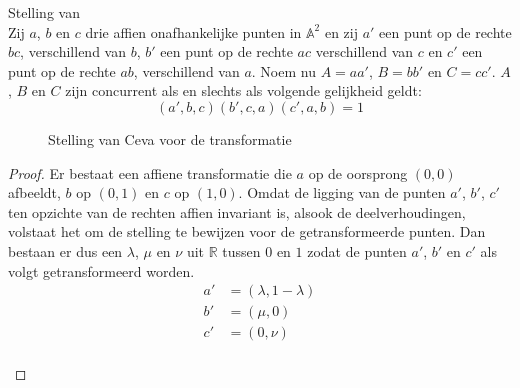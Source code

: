\documentclass[main.tex]{subfiles}
\begin{document}

\begin{st}
  Stelling van \\
  Zij $a$, $b$ en $c$ drie affien onafhankelijke punten in $\mathbb{A}^{2}$ en zij $a'$ een punt op de rechte $bc$, verschillend van $b$, $b'$ een punt op de rechte $ac$ verschillend van $c$ en $c'$ een punt op de rechte $ab$, verschillend van $a$.
  Noem nu $A = aa'$, $B = bb'$ en $C=cc'$.
  $A$, $B$ en $C$ zijn concurrent als en slechts als volgende gelijkheid geldt:
  \[ (a',b,c)(b',c,a)(c',a,b) = 1\]
  \begin{figure}[H]
    \centering
    \caption{Stelling van Ceva voor de transformatie}
    \label{fig:stelling-van-ceva-voor}
  \end{figure}

  \begin{proof}
    Er bestaat een affiene transformatie die $a$ op de oorsprong $(0,0)$ afbeeldt, $b$ op $(0,1)$ en $c$ op $(1,0)$.
    Omdat de ligging van de punten $a'$, $b'$, $c'$ ten opzichte van de rechten affien invariant is, alsook de deelverhoudingen, volstaat het om de stelling te bewijzen voor de getransformeerde punten.
    Dan bestaan er dus een $\lambda$, $\mu$ en $\nu$ uit $\mathbb{R}$ tussen $0$ en $1$ zodat de punten $a'$, $b'$ en $c'$ als volgt getransformeerd worden.
    \[
    \begin{array}{cl}
      a' &= (\lambda,1-\lambda)\\
      b' &= (\mu, 0)\\
      c' &= (0,\nu)\\
    \end{array}
    \]
    \begin{figure}[H]
      \centering
\end{figure}
\end{proof}
\end{st}
\end{document}
